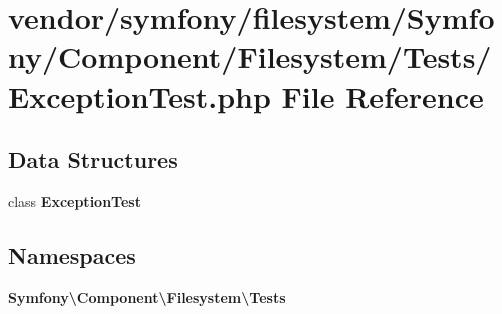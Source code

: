 \section{vendor/symfony/filesystem/\+Symfony/\+Component/\+Filesystem/\+Tests/\+Exception\+Test.php File Reference}
\label{symfony_2filesystem_2_symfony_2_component_2_filesystem_2_tests_2_exception_test_8php}
\subsection*{Data Structures}
\begin{DoxyCompactItemize}
\item 
class {\bf Exception\+Test}
\end{DoxyCompactItemize}
\subsection*{Namespaces}
\begin{DoxyCompactItemize}
\item 
 {\bf Symfony\textbackslash{}\+Component\textbackslash{}\+Filesystem\textbackslash{}\+Tests}
\end{DoxyCompactItemize}
